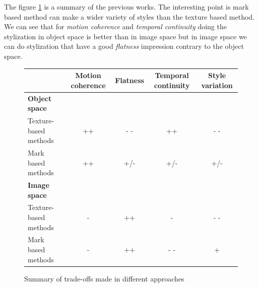 The figure \ref{tableau_comparatif} is a summary of the previous works. The interesting point is mark based method can make a wider variety of styles than the texture based method. We can see that for \textit{motion coherence} and \textit{temporal continuity} doing the stylization in object space is better than in image space but in image space we can do stylization that have a good \textit{flatness} impression contrary to the object space.


\begin{figure}

    \begin{tabular}{|l|*{4}{c|}}
    \hline
         & \textbf{Motion coherence} & \textbf{Flatness} & \textbf{Temporal continuity} & \textbf{Style variation} \\
    \hline
    \textbf{Object space} & & & & \\
    \hline
    Texture-based methods & ++ & - - & ++ & - - \\
    \hline
    Mark based methods & ++ & +/- & +/- & +/- \\
    \hline
    \textbf{Image space} & & & & \\
    \hline
    Texture-based methods & -  & ++ & - & - - \\
    \hline
    Mark based methods & - & ++ & - - & + \\
    \hline
    \end{tabular}

    \caption{Summary of trade-offs made in different approaches}
    \label{tableau_comparatif}
\end{figure}
